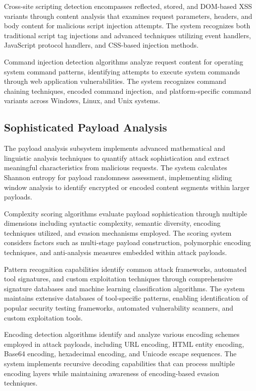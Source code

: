 Cross-site scripting detection encompasses reflected, stored, and DOM-based XSS variants through content analysis that examines request parameters, headers, and body content for malicious script injection attempts. The system recognizes both traditional script tag injections and advanced techniques utilizing event handlers, JavaScript protocol handlers, and CSS-based injection methods.

Command injection detection algorithms analyze request content for operating system command patterns, identifying attempts to execute system commands through web application vulnerabilities. The system recognizes command chaining techniques, encoded command injection, and platform-specific command variants across Windows, Linux, and Unix systems.

\subsection{Sophisticated Payload Analysis}

The payload analysis subsystem implements advanced mathematical and linguistic analysis techniques to quantify attack sophistication and extract meaningful characteristics from malicious requests. The system calculates Shannon entropy for payload randomness assessment, implementing sliding window analysis to identify encrypted or encoded content segments within larger payloads.

Complexity scoring algorithms evaluate payload sophistication through multiple dimensions including syntactic complexity, semantic diversity, encoding techniques utilized, and evasion mechanisms employed. The scoring system considers factors such as multi-stage payload construction, polymorphic encoding techniques, and anti-analysis measures embedded within attack payloads.

Pattern recognition capabilities identify common attack frameworks, automated tool signatures, and custom exploitation techniques through comprehensive signature databases and machine learning classification algorithms. The system maintains extensive databases of tool-specific patterns, enabling identification of popular security testing frameworks, automated vulnerability scanners, and custom exploitation tools.

Encoding detection algorithms identify and analyze various encoding schemes employed in attack payloads, including URL encoding, HTML entity encoding, Base64 encoding, hexadecimal encoding, and Unicode escape sequences. The system implements recursive decoding capabilities that can process multiple encoding layers while maintaining awareness of encoding-based evasion techniques.

